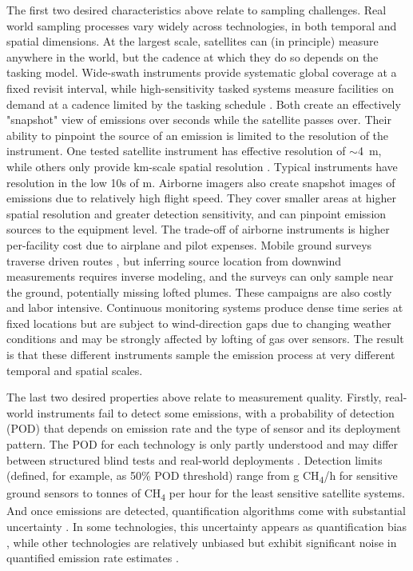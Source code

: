 \documentclass[numsec,webpdf,modern,mediumone]{oup-authoring-template}
\begin{document}
The first two desired characteristics above relate to sampling challenges. Real world sampling processes vary widely across technologies, in both temporal and spatial dimensions. At the largest scale, satellites can (in principle) measure anywhere in the world, but the cadence at which they do so depends on the tasking model. Wide-swath instruments provide systematic global coverage at a fixed revisit interval, while high-sensitivity tasked systems measure facilities on demand at a cadence limited by the tasking schedule \citep{Jacob2022, Jervis2025Science}. Both create an effectively "snapshot" view of emissions over seconds while the satellite passes over. Their ability to pinpoint the source of an emission is limited to the resolution of the instrument. One tested satellite instrument has effective resolution of $\sim$4~m, while others only provide km-scale spatial resolution \citep{Sherwin2023, Sherwin2024AMT, Reuland2026}. Typical instruments have resolution in the low 10s of m. Airborne imagers also create snapshot images of emissions due to relatively high flight speed. They cover smaller areas at higher spatial resolution \citep{Cusworth2026NatComms, Sherwin2024Nature} and greater detection sensitivity, and can pinpoint emission sources to the equipment level. The trade-off of airborne instruments is higher per-facility cost due to airplane and pilot expenses. Mobile ground surveys traverse driven routes \citep{Omara2018}, but inferring source location from downwind measurements requires inverse modeling, and the surveys can only sample near the ground, potentially missing lofted plumes. These campaigns are also costly and labor intensive. Continuous monitoring systems produce dense time series at fixed locations but are subject to wind-direction gaps due to changing weather conditions \citep{Daniels2024} and may be strongly affected by lofting of gas over sensors. The result is that these different instruments sample the emission process at very different temporal and spatial scales.

The last two desired properties above relate to measurement quality. Firstly, real-world instruments fail to detect some emissions, with a probability of detection (POD) that depends on emission rate \citep{Sherwin2021, Sherwin2023} and the type of sensor and its deployment pattern. The POD for each technology is only partly understood and may differ between structured blind tests and real-world deployments \citep{Cusworth2026NatComms}. Detection limits (defined, for example, as 50\% POD threshold) range from g CH\textsubscript{4}/h for sensitive ground sensors to tonnes of CH\textsubscript{4} per hour for the least sensitive satellite systems. And once emissions are detected, quantification algorithms come with substantial uncertainty \citep{Sherwin2023, Wigle2024}. In some technologies, this uncertainty appears as quantification bias \citep{chen2024comparing}, while other technologies are relatively unbiased but exhibit significant noise in quantified emission rate estimates \citep{ElAbbadi2024}.
\end{document}
